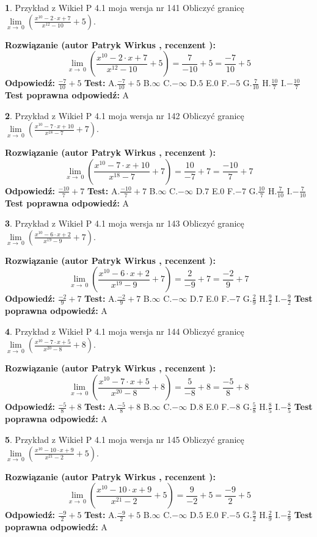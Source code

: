 \documentclass[12pt, a4paper]{article}
\theoremstyle{definition} %
\newtheorem{zad}{}
\newcommand{\zadStart}[1]{\begin{zad}#1\newline}
\newcommand{\zadStop}{\end{zad}}
\newcommand{\rozwStart}[2]{\noindent \textbf{Rozwiązanie (autor #1 , recenzent #2): }\newline}
\newcommand{\rozwStop}{\newline}
\newcommand{\odpStart}{\noindent \textbf{Odpowiedź:}\newline}
\newcommand{\odpStop}{\newline}
\newcommand{\testStart}{\noindent \textbf{Test:}\newline}
\newcommand{\testStop}{\newline}
\newcommand{\kluczStart}{\noindent \textbf{Test poprawna odpowiedź:}\newline}
\newcommand{\kluczStop}{\newline}
\begin{document}
\zadStart{Przykład z Wikieł P 4.1 moja wersja nr 141}
Obliczyć granicę $\lim\limits_{x\to\ 0}(\frac{x^{10}-2 \cdot x +7}{x^{12}-10}+5)$.
\zadStop
\rozwStart{Patryk Wirkus}{}
$$\lim\limits_{x\to\ 0}(\frac{x^{10}-2 \cdot x +7}{x^{12}-10}+5)=\frac{7}{-10}+5=\frac{-7}{10}+5$$
\rozwStop
\odpStart
$\frac{-7}{10}+5$
\odpStop
\testStart
A.$\frac{-7}{10}+5$
B.$\infty$
C.$-\infty$
D.$5$
E.$0$
F.$-5$
G.$\frac{7}{10}$
H.$\frac{10}{7}$
I.$-\frac{10}{7}$
\testStop
\kluczStart
A
\kluczStop



\zadStart{Przykład z Wikieł P 4.1 moja wersja nr 142}
Obliczyć granicę $\lim\limits_{x\to\ 0}(\frac{x^{10}-7 \cdot x +10}{x^{18}-7}+7)$.
\zadStop
\rozwStart{Patryk Wirkus}{}
$$\lim\limits_{x\to\ 0}(\frac{x^{10}-7 \cdot x +10}{x^{18}-7}+7)=\frac{10}{-7}+7=\frac{-10}{7}+7$$
\rozwStop
\odpStart
$\frac{-10}{7}+7$
\odpStop
\testStart
A.$\frac{-10}{7}+7$
B.$\infty$
C.$-\infty$
D.$7$
E.$0$
F.$-7$
G.$\frac{10}{7}$
H.$\frac{7}{10}$
I.$-\frac{7}{10}$
\testStop
\kluczStart
A
\kluczStop



\zadStart{Przykład z Wikieł P 4.1 moja wersja nr 143}
Obliczyć granicę $\lim\limits_{x\to\ 0}(\frac{x^{10}-6 \cdot x +2}{x^{19}-9}+7)$.
\zadStop
\rozwStart{Patryk Wirkus}{}
$$\lim\limits_{x\to\ 0}(\frac{x^{10}-6 \cdot x +2}{x^{19}-9}+7)=\frac{2}{-9}+7=\frac{-2}{9}+7$$
\rozwStop
\odpStart
$\frac{-2}{9}+7$
\odpStop
\testStart
A.$\frac{-2}{9}+7$
B.$\infty$
C.$-\infty$
D.$7$
E.$0$
F.$-7$
G.$\frac{2}{9}$
H.$\frac{9}{2}$
I.$-\frac{9}{2}$
\testStop
\kluczStart
A
\kluczStop



\zadStart{Przykład z Wikieł P 4.1 moja wersja nr 144}
Obliczyć granicę $\lim\limits_{x\to\ 0}(\frac{x^{10}-7 \cdot x +5}{x^{20}-8}+8)$.
\zadStop
\rozwStart{Patryk Wirkus}{}
$$\lim\limits_{x\to\ 0}(\frac{x^{10}-7 \cdot x +5}{x^{20}-8}+8)=\frac{5}{-8}+8=\frac{-5}{8}+8$$
\rozwStop
\odpStart
$\frac{-5}{8}+8$
\odpStop
\testStart
A.$\frac{-5}{8}+8$
B.$\infty$
C.$-\infty$
D.$8$
E.$0$
F.$-8$
G.$\frac{5}{8}$
H.$\frac{8}{5}$
I.$-\frac{8}{5}$
\testStop
\kluczStart
A
\kluczStop



\zadStart{Przykład z Wikieł P 4.1 moja wersja nr 145}
Obliczyć granicę $\lim\limits_{x\to\ 0}(\frac{x^{10}-10 \cdot x +9}{x^{21}-2}+5)$.
\zadStop
\rozwStart{Patryk Wirkus}{}
$$\lim\limits_{x\to\ 0}(\frac{x^{10}-10 \cdot x +9}{x^{21}-2}+5)=\frac{9}{-2}+5=\frac{-9}{2}+5$$
\rozwStop
\odpStart
$\frac{-9}{2}+5$
\odpStop
\testStart
A.$\frac{-9}{2}+5$
B.$\infty$
C.$-\infty$
D.$5$
E.$0$
F.$-5$
G.$\frac{9}{2}$
H.$\frac{2}{9}$
I.$-\frac{2}{9}$
\testStop
\kluczStart
A
\kluczStop
\end{document}
